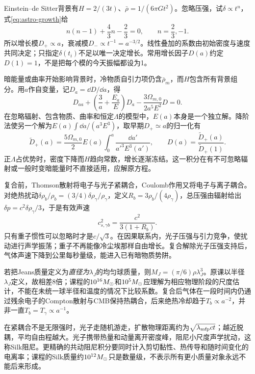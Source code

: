 Einstein--de Sitter背景有$H=2/(3t)$、$\bar\rho=1/(6\pi Gt^2)$。忽略压强，试$\delta\propto t^n$，式\eqref{eq:astro-growth}给
\[
 n(n-1)+\frac43n-\frac23=0,
 \qquad n=\frac23,-1.
\]
所以增长模$D_+\propto a$，衰减模$D_-\propto t^{-1}=a^{-3/2}$。线性叠加的系数由初始密度与速度共同决定；只指定$\delta(t_i)$不足以唯一决定增长。常用增长因子$D(a)$约定$D(1)=1$，不是把每个模的今天振幅都设为1。

暗能量或曲率开始影响背景时，冷物质自引力项仍含$\bar\rho_m$，而$H$包含所有背景组分。用$a$作自变量，记$D_a=\dd D/\dd a$，得
\[
 D_{aa}+\left(\frac3a+\frac{E_a}{E}\right)D_a
 -\frac{3\Omega_{m,0}}{2a^5E^2}D=0.
\]
在忽略辐射、包含物质、曲率和恒定$\Lambda$的模型中，$E(a)$本身是一个独立解。降阶法使另一个解为$E(a)\int\dd a/(a^3E^3)$，取早期$D_+\simeq a$的归一化有
\[
 \widetilde D_+(a)=\frac{5\Omega_{m,0}}2E(a)\int_0^a\frac{\dd a'}{a'^3E^3(a')},
 \qquad D(a)=\frac{\widetilde D_+(a)}{\widetilde D_+(1)}.
\]
正$\Lambda$占优势时，密度下降而$H$趋向常数，增长逐渐冻结。这一积分在有不可忽略辐射或一般时变暗能量时不直接适用，应解原方程。

复合前，Thomson散射将电子与光子紧耦合，Coulomb作用又将电子与离子耦合。对绝热扰动$\delta\rho_b/\rho_b=(3/4)\delta\rho_\gamma/\rho_\gamma$，定义$R_b=3\rho_b/(4\rho_\gamma)$，总压强由辐射给出$\delta p=c^2\delta\rho_\gamma/3$，于是有效声速
\[
 c_{s,\gamma b}^2=\frac{c^2}{3(1+R_b)}.
\]
只有重子惯性可以忽略时才是$c/\sqrt3$。在因果联系内，光子压强与引力竞争，使扰动进行声学振荡；重子不再能像冷尘埃那样自由增长。复合解除光子压强支持后，气体声速下降到公里每秒量级，能进入已有暗物质势阱。

若把Jeans质量定义为\emph{直径为}$\lambda_J$的均匀球质量，则$M_J=(\pi/6)\rho\lambda_J^3$。原课以半径$\lambda_J$定义，故相差8倍；课程的$10^{16}M_{\odot}$和$10^5M_{\odot}$应理解为相应物理阶段的尺度估计，不能在未统一球半径和温度的情况下比较系数。复合后气体在一段时间内仍通过残余电子的Compton散射与CMB保持热耦合，后来绝热冷却趋于$T_b\propto a^{-2}$，并非一直$T_b=T_\gamma\propto a^{-1}$。

在紧耦合不是无限强时，光子走随机游走，扩散物理距离约为$\sqrt{\lambda_{\rm mfp}ct}$；越近脱耦，平均自由程越大。光子携带热量和动量离开密度峰，阻尼小尺度声学扰动，这称Silk阻尼。更精确的共动阻尼积分要同时计入剪切黏性、热传导和随时间变化的电离率；课程的Silk质量约$10^{12}M_{\odot}$只是数量级，不表示所有更小质量对象永远不能后来形成。

